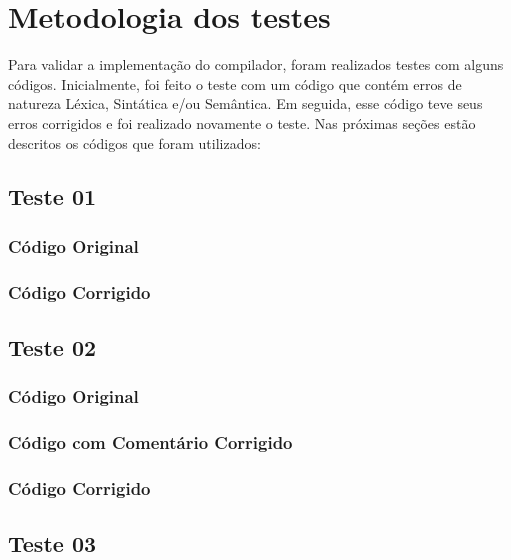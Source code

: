 \chapter{Metodologia dos testes}
\label{cap:testes}

Para validar a implementação do compilador, foram realizados testes com alguns códigos.
Inicialmente, foi feito o teste com um código que contém erros de natureza Léxica, Sintática e/ou Semântica.
Em seguida, esse código teve seus erros corrigidos e foi realizado novamente o teste.
Nas próximas seções estão descritos os códigos que foram utilizados:

\section{Teste 01}
\label{subsec:teste01}

\subsection{Código Original}


\subsection{Código Corrigido}


\section{Teste 02}
\label{subsec:teste02}

\subsection{Código Original}


\subsection{Código com Comentário Corrigido}


\subsection{Código Corrigido}


\section{Teste 03}
\label{subsec:teste03}

